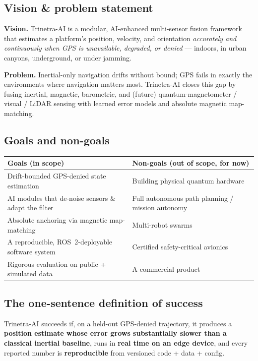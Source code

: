 \documentclass[11pt]{article}
\begin{document}
\subsection{Vision \& problem statement}

\begin{defbox}
\textbf{Vision.} Trinetra-AI is a modular, AI-enhanced multi-sensor fusion framework that
estimates a platform's position, velocity, and orientation \emph{accurately and continuously
when GPS is unavailable, degraded, or denied} --- indoors, in urban canyons, underground, or
under jamming.

\textbf{Problem.} Inertial-only navigation drifts without bound; GPS fails in exactly the
environments where navigation matters most. Trinetra-AI closes this gap by fusing inertial,
magnetic, barometric, and (future) quantum-magnetometer / visual / LiDAR sensing with learned
error models and absolute magnetic map-matching.
\end{defbox}

\subsection{Goals and non-goals}

\begin{center}\footnotesize
\begin{tabular}{@{}p{6.2cm}p{6.2cm}@{}}
\toprule
\textbf{Goals (in scope)} & \textbf{Non-goals (out of scope, for now)}\\
\midrule
Drift-bounded GPS-denied state estimation & Building physical quantum hardware\\
AI modules that de-noise sensors \& adapt the filter & Full autonomous path planning / mission autonomy\\
Absolute anchoring via magnetic map-matching & Multi-robot swarms\\
A reproducible, ROS~2-deployable software system & Certified safety-critical avionics\\
Rigorous evaluation on public + simulated data & A commercial product\\
\bottomrule
\end{tabular}
\end{center}

\subsection{The one-sentence definition of success}

\begin{dodbox}
Trinetra-AI succeeds if, on a held-out GPS-denied trajectory, it produces a
\textbf{position estimate whose error grows substantially slower than a classical inertial
baseline}, runs in \textbf{real time on an edge device}, and every reported number is
\textbf{reproducible} from versioned code + data + config.
\end{dodbox}
\end{document}
